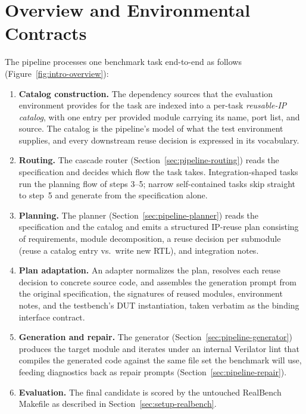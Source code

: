 \section{Overview and Environmental Contracts}
\label{sec:pipeline-overview}

The pipeline processes one benchmark task end-to-end as follows
(Figure~\ref{fig:intro-overview}):

\begin{enumerate}
  \item \textbf{Catalog construction.} The dependency sources that the
    evaluation environment provides for the task are indexed into a
    per-task \emph{reusable-IP catalog}, with one entry per provided module
    carrying its name, port list, and source. The catalog is the
    pipeline's model of what the test environment supplies, and every
    downstream reuse decision is expressed in its vocabulary.
  \item \textbf{Routing.} The cascade router
    (Section~\ref{sec:pipeline-routing}) reads the specification and
    decides which flow the task takes. Integration-shaped tasks run
    the planning flow of steps 3--5; narrow self-contained tasks skip
    straight to step~5 and generate from the specification alone.
  \item \textbf{Planning.} The planner (Section~\ref{sec:pipeline-planner})
    reads the specification and the catalog and emits a structured IP-reuse
    plan consisting of requirements, module decomposition, a reuse decision per submodule
    (reuse a catalog entry vs.\ write new RTL), and integration notes.
  \item \textbf{Plan adaptation.} An adapter normalizes the plan, resolves
    each reuse decision to concrete source code, and assembles the
    generation prompt from the original specification, the signatures of reused
    modules, environment notes, and the testbench's DUT instantiation, taken
    verbatim as the binding interface contract.
  \item \textbf{Generation and repair.} The generator
    (Section~\ref{sec:pipeline-generator}) produces the target module and
    iterates under an internal Verilator lint that compiles the generated
    code against the same file set the benchmark will use, feeding
    diagnostics back as repair prompts (Section~\ref{sec:pipeline-repair}).
  \item \textbf{Evaluation.} The final candidate is scored by the untouched
    RealBench Makefile as described in Section~\ref{sec:setup-realbench}.
\end{enumerate}

